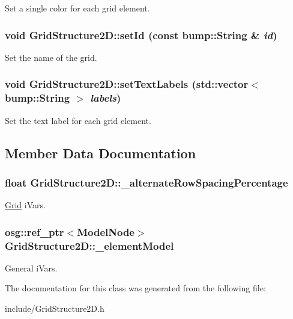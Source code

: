 Set a single color for each grid element. \hypertarget{class_grid_structure2_d_a88998a17969451df48250f98ad2b406d}{
\subsubsection[{setId}]{\setlength{\rightskip}{0pt plus 5cm}void GridStructure2D::setId (const bump::String \& {\em id})}}
\label{class_grid_structure2_d_a88998a17969451df48250f98ad2b406d}
Set the name of the grid. \hypertarget{class_grid_structure2_d_a59ae6f160f10f31c33f01677c2efaa3b}{
\subsubsection[{setTextLabels}]{\setlength{\rightskip}{0pt plus 5cm}void GridStructure2D::setTextLabels (std::vector$<$ bump::String $>$ {\em labels})}}
\label{class_grid_structure2_d_a59ae6f160f10f31c33f01677c2efaa3b}
Set the text label for each grid element. 

\subsection{Member Data Documentation}
\hypertarget{class_grid_structure2_d_ab63375bf820bbe676613711abd32d3a6}{
\subsubsection[{\_\-alternateRowSpacingPercentage}]{\setlength{\rightskip}{0pt plus 5cm}float {\bf GridStructure2D::\_\-alternateRowSpacingPercentage}}}
\label{class_grid_structure2_d_ab63375bf820bbe676613711abd32d3a6}
\hyperlink{class_grid}{Grid} iVars. \hypertarget{class_grid_structure2_d_a06190b1d1ab65bbc6dfcfa09f3d30c66}{
\subsubsection[{\_\-elementModel}]{\setlength{\rightskip}{0pt plus 5cm}osg::ref\_\-ptr$<$ModelNode$>$ {\bf GridStructure2D::\_\-elementModel}}}
\label{class_grid_structure2_d_a06190b1d1ab65bbc6dfcfa09f3d30c66}
General iVars. 

The documentation for this class was generated from the following file:\begin{DoxyCompactItemize}
\item 
include/GridStructure2D.h\end{DoxyCompactItemize}
